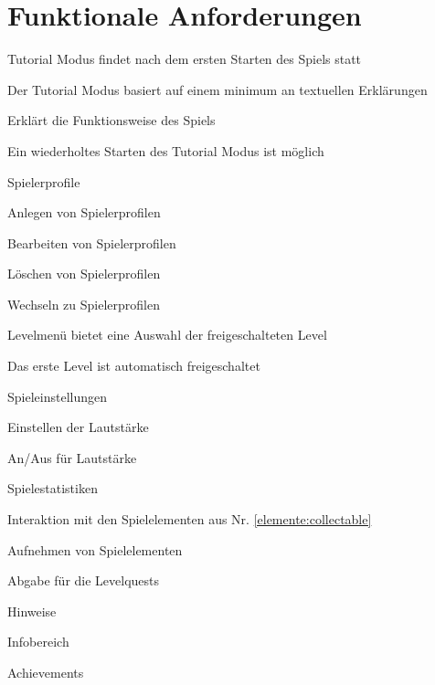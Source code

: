 \documentclass{scrartcl}
\begin{document}
\clearpage

\section{Funktionale Anforderungen}

\begin{falist}
	\item Tutorial Modus findet nach dem ersten Starten des Spiels statt
	\begin{falist}
        \item Der Tutorial Modus basiert auf einem minimum an textuellen Erklärungen
        \item Erklärt die Funktionsweise des Spiels
		\item Ein wiederholtes Starten des Tutorial Modus ist möglich
	\end{falist}
	\item Spielerprofile
	\begin{falist}
		\item Anlegen von Spielerprofilen
		\item Bearbeiten von Spielerprofilen
		\item Löschen von Spielerprofilen
		\item Wechseln zu Spielerprofilen
	\end{falist}
	\item Levelmenü bietet eine Auswahl der freigeschalteten Level
    \begin{falist}
        \item Das erste Level ist automatisch freigeschaltet
    \end{falist}
	\item Spieleinstellungen
	\begin{falist}
		\item Einstellen der Lautstärke
		\item An/Aus für Lautstärke
	\end{falist}
	\item Spielestatistiken
	\begin{falist}
		\item
	\end{falist}
	\item Interaktion mit den Spielelementen aus Nr. \ref{elemente:collectable}
	\begin{falist}
		\item Aufnehmen von Spielelementen
		\item Abgabe für die Levelquests
	\end{falist}
	\item Hinweise
	\item Infobereich
    \item Achievements
\end{falist}
\end{document}
